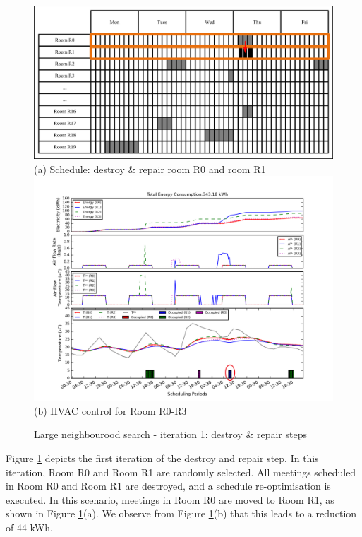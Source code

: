 \begin{figure}
	\centering
		\includegraphics[width=0.9\linewidth]{figs/lns_sche_ds1.jpg} \\
(a) Schedule: destroy \& repair room R0 and room R1 \\[6pt]		
		\includegraphics[width=1\linewidth]{figs/lns_dr1.png} \\
(b) HVAC control for Room R0-R3  \\[6pt]
	\caption{Large neighbourood search - iteration 1: destroy \& repair steps}
	\label{fig:lns_dr1}
\end{figure}

Figure \ref{fig:lns_dr1} depicts the first iteration of the destroy and repair step. In this iteration, Room R0 and Room R1 are randomly selected. All meetings scheduled in Room R0 and Room R1 are destroyed, and a schedule re-optimisation is executed. In this scenario, meetings in Room R0 are moved to Room R1, as shown in Figure \ref{fig:lns_dr1}(a). We observe from Figure \ref{fig:lns_dr1}(b) that this leads to a reduction of 44 kWh. %


